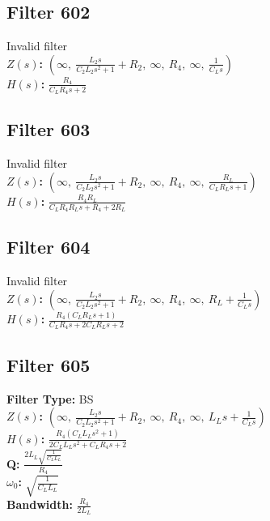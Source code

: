 \documentclass{article}
\begin{document}
\subsection*{Filter 602}
Invalid filter \\ 
\textbf{$Z(s)$:} $\left( \infty, \  \frac{L_{2} s}{C_{2} L_{2} s^{2} + 1} + R_{2}, \  \infty, \  R_{4}, \  \infty, \  \frac{1}{C_{L} s}\right)$ \\ 
\textbf{$H(s)$:} $\frac{R_{4}}{C_{L} R_{4} s + 2}$ \\ 
\subsection*{Filter 603}
Invalid filter \\ 
\textbf{$Z(s)$:} $\left( \infty, \  \frac{L_{2} s}{C_{2} L_{2} s^{2} + 1} + R_{2}, \  \infty, \  R_{4}, \  \infty, \  \frac{R_{L}}{C_{L} R_{L} s + 1}\right)$ \\ 
\textbf{$H(s)$:} $\frac{R_{4} R_{L}}{C_{L} R_{4} R_{L} s + R_{4} + 2 R_{L}}$ \\ 
\subsection*{Filter 604}
Invalid filter \\ 
\textbf{$Z(s)$:} $\left( \infty, \  \frac{L_{2} s}{C_{2} L_{2} s^{2} + 1} + R_{2}, \  \infty, \  R_{4}, \  \infty, \  R_{L} + \frac{1}{C_{L} s}\right)$ \\ 
\textbf{$H(s)$:} $\frac{R_{4} \left(C_{L} R_{L} s + 1\right)}{C_{L} R_{4} s + 2 C_{L} R_{L} s + 2}$ \\ 
\subsection*{Filter 605}
\textbf{Filter Type:} BS \\ 
\textbf{$Z(s)$:} $\left( \infty, \  \frac{L_{2} s}{C_{2} L_{2} s^{2} + 1} + R_{2}, \  \infty, \  R_{4}, \  \infty, \  L_{L} s + \frac{1}{C_{L} s}\right)$ \\ 
\textbf{$H(s)$:} $\frac{R_{4} \left(C_{L} L_{L} s^{2} + 1\right)}{2 C_{L} L_{L} s^{2} + C_{L} R_{4} s + 2}$ \\ 
\textbf{Q:} $\frac{2 L_{L} \sqrt{\frac{1}{C_{L} L_{L}}}}{R_{4}}$ \\ 
\textbf{$\omega_0$:} $\sqrt{\frac{1}{C_{L} L_{L}}}$ \\ 
\textbf{Bandwidth:} $\frac{R_{4}}{2 L_{L}}$ \\ 
\end{document}
